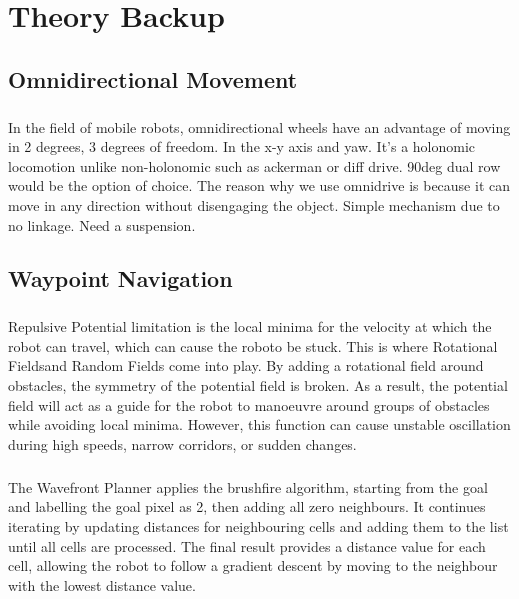 \chapter{Theory Backup}

\section{Omnidirectional Movement}
\paragraph*{}
In the field of mobile robots, omnidirectional wheels have an advantage of moving in 2 degrees, 3 degrees of freedom. In the x-y axis and yaw. It's a holonomic locomotion unlike non-holonomic such as ackerman or diff drive. 90deg dual row would be the option of choice. The reason why we use omnidrive is because it can move in any direction without disengaging the object. Simple mechanism due to no linkage. Need a suspension.

\section{Waypoint Navigation}

\paragraph*{}
Repulsive Potential limitation is the local minima for the velocity at which the robot can travel, which can cause the roboto be stuck. This is where Rotational Fieldsand Random Fields come into play. By adding a rotational field around obstacles, the symmetry of the potential field is broken. As a result, the potential field will act as a guide for the robot to manoeuvre around groups of obstacles while avoiding local minima. However, this function can cause unstable oscillation during high speeds, narrow corridors, or sudden changes. 

\paragraph*{}
The Wavefront Planner applies the brushfire algorithm, starting from the goal and labelling the goal pixel as 2, then adding all zero neighbours. It continues iterating by updating distances for neighbouring cells and adding them to the list until all cells are processed. The final result provides a distance value for each cell, allowing the robot to follow a gradient descent by moving to the neighbour with the lowest distance value.

